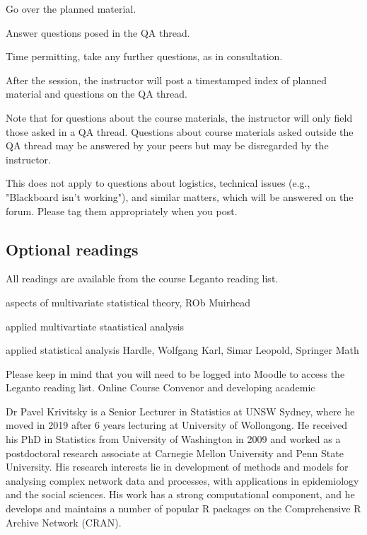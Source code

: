 \documentclass[11pt]{article}
\begin{document}
        Go over the planned material.

        Answer questions posed in the QA thread.

        Time permitting, take any further questions, as in consultation.

After the session, the instructor will post a timestamped index of planned
material and questions on the QA thread.

Note that for questions about the course materials, the instructor will only
field those asked in a QA thread.
Questions about course materials asked outside the QA thread may be answered
by your peers but may be disregarded by the instructor.

This does not apply to questions about logistics, technical issues (e.g.,
"Blackboard isn't working"), and similar matters, which will be answered on
the forum.
Please tag them appropriately when you post.

\subsection{Optional readings}
All readings are available from the course Leganto reading list.
\begin{description}
  \item aspects of multivariate statistical theory, ROb Muirhead
  \item applied multivartiate staatistical analysis
  \item applied statistical analysis Hardle, Wolfgang Karl, Simar Leopold, Springer Math
\end{description}
Please keep in mind that you will need to be logged into Moodle to access the
Leganto reading list.
Online Course Convenor and developing academic

Dr Pavel Krivitsky is a Senior Lecturer in Statistics at UNSW Sydney, where he
moved in 2019 after 6 years lecturing at University of Wollongong.
He received his PhD in Statistics from University of Washington in 2009 and
worked as a postdoctoral research associate at Carnegie Mellon University and
Penn State University.
His research interests lie in development of methods and models for analysing
complex network data and processes, with applications in epidemiology and the
social sciences.
His work has a strong computational component, and he develops and maintains a
number of popular R packages on the Comprehensive R Archive Network (CRAN).
\end{document}
